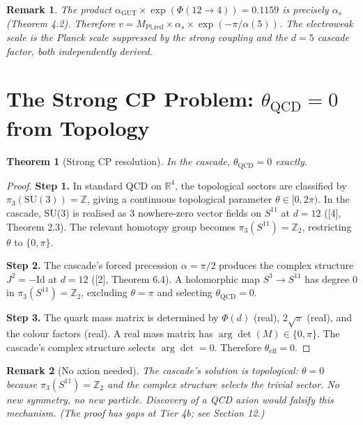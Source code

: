 \documentclass[12pt,a4paper]{article}
\newtheorem{theorem}{Theorem}[section]
\newtheorem*{remark}{Remark}
\begin{document}
\begin{remark}
The product $\alpha_{\text{GUT}} \times \exp(\Phi(12 \to 4)) = 0.1159$ is precisely $\alpha_s$ (Theorem 4.2). Therefore $v = M_{\text{Pl,red}} \times \alpha_s \times \exp(-\pi/\alpha(5))$. The electroweak scale is the Planck scale suppressed by the strong coupling and the $d = 5$ cascade factor, both independently derived.
\end{remark}

\section{The Strong CP Problem: $\theta_{\text{QCD}} = 0$ from Topology}

\begin{theorem}[Strong CP resolution]
In the cascade, $\theta_{\text{QCD}} = 0$ exactly.
\end{theorem}

\begin{proof}
\textbf{Step 1.} In standard QCD on $\mathbb{R}^4$, the topological sectors are classified by $\pi_3(\text{SU}(3)) = \mathbb{Z}$, giving a continuous topological parameter $\theta \in [0, 2\pi)$. In the cascade, SU(3) is realised as 3 nowhere-zero vector fields on $S^{11}$ at $d = 12$ ([4], Theorem 2.3). The relevant homotopy group becomes $\pi_3(S^{11}) = \mathbb{Z}_2$, restricting $\theta$ to $\{0, \pi\}$.

\textbf{Step 2.} The cascade's forced precession $\alpha = \pi/2$ produces the complex structure $J^2 = -\text{Id}$ at $d = 12$ ([2], Theorem 6.4). A holomorphic map $S^3 \to S^{11}$ has degree 0 in $\pi_3(S^{11}) = \mathbb{Z}_2$, excluding $\theta = \pi$ and selecting $\theta_{\text{QCD}} = 0$.

\textbf{Step 3.} The quark mass matrix is determined by $\Phi(d)$ (real), $2\sqrt{\pi}$ (real), and the colour factors (real). A real mass matrix has $\arg\det(M) \in \{0, \pi\}$. The cascade's complex structure selects $\arg\det = 0$. Therefore $\theta_{\text{eff}} = 0$.
\end{proof}

\begin{remark}[No axion needed]
The cascade's solution is topological: $\theta = 0$ because $\pi_3(S^{11}) = \mathbb{Z}_2$ and the complex structure selects the trivial sector. No new symmetry, no new particle. Discovery of a QCD axion would falsify this mechanism. (The proof has gaps at Tier 4b; see Section 12.)
\end{remark}
\end{document}
